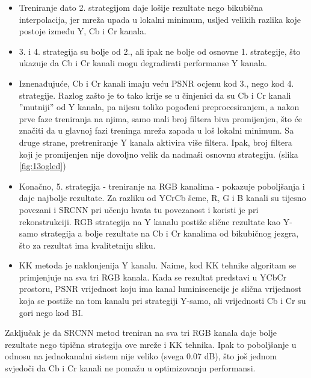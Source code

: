 \documentclass[12pt]{report}
\numberwithin{equation}{section}
\begin{document}
  \begin{itemize}
  
   \item Treniranje dato 2. strategijom daje lošije rezultate nego bikubična interpolacija, jer mreža upada u lokalni minimum, usljed velikih razlika koje postoje između Y, Cb i Cr kanala. 
   \item 3. i 4. strategija su bolje od 2., ali ipak ne bolje od osnovne 1. strategije, što ukazuje da Cb i Cr kanali mogu degradirati performanse Y kanala.
   \item Iznenađujuće, Cb i Cr kanali imaju veću PSNR ocjenu kod 3., nego kod 4. strategije. Razlog zašto je to tako krije se u činjenici da su Cb i Cr kanali ''mutniji'' od Y kanala, pa nijesu toliko pogođeni preprocesiranjem, a nakon prve faze treniranja na njima, samo mali broj filtera biva promijenjen, što će značiti da u glavnoj fazi treninga mreža zapada u loš lokalni minimum. Sa druge strane, pretreniranje Y kanala aktivira više filtera. Ipak, broj filtera koji je promijenjen nije dovoljno velik da nadmaši osnovnu strategiju. (slika \ref{fig:13ogled})
   \item Konačno, 5. strategija - treniranje na RGB kanalima - pokazuje poboljšanja i daje najbolje rezultate. Za razliku od YCrCb šeme, R, G i B kanali su tijesno povezani i SRCNN pri učenju hvata tu povezanost i koristi je pri rekonstrukciji. RGB strategija na Y kanalu postiže slične rezultate kao Y-samo strategija a bolje rezultate na Cb i Cr kanalima od bikubičnog jezgra, što za rezultat ima kvalitetniju sliku. 
   
   \item KK metoda je naklonjenija Y kanalu. Naime, kod KK tehnike algoritam se primjenjuje na sva tri RGB kanala. Kada se rezultat predstavi u YCbCr prostoru, PSNR vrijednost koju ima kanal luminiscencije je slična vrijednost koja se postiže na tom kanalu pri strategiji Y-samo, ali vrijednosti Cb i Cr su gori nego kod BI.  
   
  \end{itemize}
 

  
Zaključak je da SRCNN metod treniran na sva tri RGB kanala daje bolje rezultate nego tipična strategija ove mreže i KK tehnika. Ipak to poboljšanje u odnosu na jednokanalni sistem nije veliko (svega 0.07 dB), što još jednom svjedoči da Cb i Cr kanali ne pomažu u optimizovanju performansi. 
\end{document}
